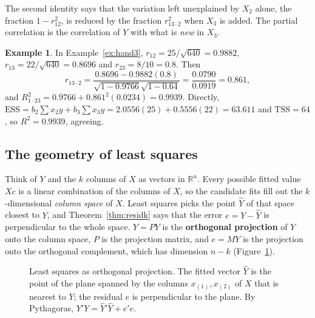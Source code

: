 \documentclass[11pt,a4paper]{article}
\numberwithin{equation}{section}
\theoremstyle{definition}
\newtheorem{exa}[thm]{Example}
\begin{document}
The second identity says that the variation left unexplained by $X_2$ alone, the fraction $1 - r_{12}^2$, is reduced by the fraction $r_{13\cdot2}^2$ when
$X_3$ is added. The partial correlation is the correlation of $Y$ with what is \emph{new} in $X_3$.

\begin{exa}
\label{ex:hand3partial}
In Example~\ref{ex:hand3}, $r_{12} = 25/\sqrt{640} = 0.9882$, $r_{13} = 22/\sqrt{640} = 0.8696$ and $r_{23} = 8/10 = 0.8$. Then
\[
r_{13\cdot2} = \frac{0.8696 - 0.9882(0.8)}{\sqrt{1 - 0.9766}\sqrt{1 - 0.64}} = \frac{0.0790}{0.0919} = 0.861 ,
\]
and $R^2_{1\cdot23} = 0.9766 + 0.861^2(0.0234) = 0.9939$. Directly, $\text{ESS} = b_2\sum x_2y + b_3\sum x_3y = 2.0556(25) + 0.5556(22) = 63.611$ and
$\text{TSS} = 64$, so $R^2 = 0.9939$, agreeing.
\end{exa}

\subsection{The geometry of least squares}
\label{ssec:geometry}

Think of $Y$ and the $k$ columns of $X$ as vectors in $\mathbb R^n$. Every possible fitted value $Xc$ is a linear combination of the columns of $X$, so
the candidate fits fill out the $k$-dimensional \emph{column space} of $X$. Least squares picks the point $\hat Y$ of that space closest to $Y$, and
Theorem~\ref{thm:residk} says that the error $e = Y - \hat Y$ is perpendicular to the whole space. $\hat Y = PY$ is the \textbf{orthogonal projection} of
$Y$ onto the column space, $P$ is the projection matrix, and $e = MY$ is the projection onto the orthogonal complement, which has dimension $n - k$
(Figure~\ref{fig:projection}).

\begin{figure}[H]
\centering
{}
\caption{Least squares as orthogonal projection. The fitted vector $\hat Y$ is the point of the plane spanned by the columns $x_{(1)}, x_{(2)}$ of $X$ that is
nearest to $Y$; the residual $e$ is perpendicular to the plane. By Pythagoras, $Y'Y = \hat Y'\hat Y + e'e$.}
\label{fig:projection}
\end{figure}
\end{document}

